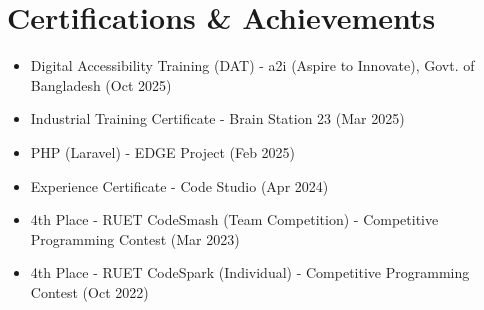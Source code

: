 \documentclass[10pt, a4paper]{article}
\newcommand{\resitem}[1]{\item #1} %
\begin{document}
\section{Certifications \& Achievements}
\begin{itemize}
    \resitem{Digital Accessibility Training (DAT) - a2i (Aspire to Innovate), Govt. of Bangladesh \href{https://drive.google.com/file/d/1r0YTwNWt2G--afHjJkN7hf9taI2d445W/view?usp=sharing}{\faExternalLink*} (Oct 2025)}
    \resitem{Industrial Training Certificate - Brain Station 23 \href{https://drive.google.com/file/d/1_Smp7BMAuuKgN4McPJv-UFcsK27mXtBj/view?usp=sharing}{\faExternalLink*} (Mar 2025)}
    \resitem{PHP (Laravel) - EDGE Project \href{https://training.edge.gov.bd/certificate-validation?certificate_no=EDGE-DSTS-116-6631-00012}{\faExternalLink*} (Feb 2025)}
    \resitem{Experience Certificate - Code Studio \href{https://drive.google.com/file/d/195bms3HX2eF-QGjPypnlaZmQLn2nv7xT/view?usp=sharing}{\faExternalLink*} (Apr 2024)}
    \resitem{4th Place - RUET CodeSmash (Team Competition) - Competitive Programming Contest \href{https://drive.google.com/file/d/1ESOpq2KagzqafmpEjau5RvhTNeop4FKN/view?usp=sharing}{\faExternalLink*} (Mar 2023)}
    \resitem{4th Place - RUET CodeSpark (Individual) - Competitive Programming Contest \href{https://drive.google.com/file/d/18CvmRA4xr3TkCpSjNxsQMxBSmh_yQUQz/view?usp=sharing}{\faExternalLink*} (Oct 2022)}
\end{itemize}

\end{document}
